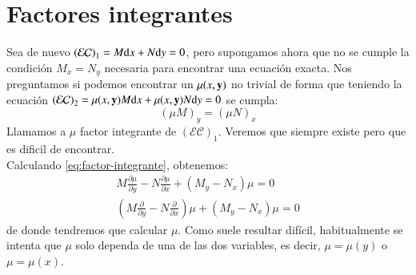 \section{Factores integrantes}
Sea de nuevo $\mathcal{(EC)}_1 = M \mathrm{d} x + N\mathrm{d} y = 0$, pero supongamos ahora que no se cumple la condición $M_x = N_y$ necesaria para encontrar una ecuación exacta. Nos preguntamos si podemos encontrar un $\mu(x, \mathbf{y})$ no trivial de forma que teniendo la ecuación $\mathcal{(EC)}_2 = \mu(x, \mathbf{y}) M \mathrm{d} x + \mu(x, \mathbf{y}) N\mathrm{d} y = 0$ se cumpla:
\begin{equation}\label{eq:factor-integrante}
    (\mu M)_y = (\mu N)_x
\end{equation}
Llamamos a $\mu$ factor integrante de $\mathcal{(EC)}_1$. Veremos que siempre existe pero que es dificil de encontrar.\\
Calculando \ref{eq:factor-integrante}, obtenemos:
\begin{gather*}
    M \frac{\partial \mu}{\partial y} - N \frac{\partial \mu}{\partial x} + (M_y - N_x) \mu = 0\\
    \left(M \frac{\partial}{\partial y} - N \frac{\partial}{\partial x}\right)\mu + (M_y - N_x) \mu = 0
\end{gather*}
de donde tendremos que calcular $\mu$. Como suele resultar difícil, habitualmente se intenta que $\mu$ solo dependa de una de las dos variables, es decir, $\mu=\mu(y)$ o $\mu=\mu(x)$.\\\\

